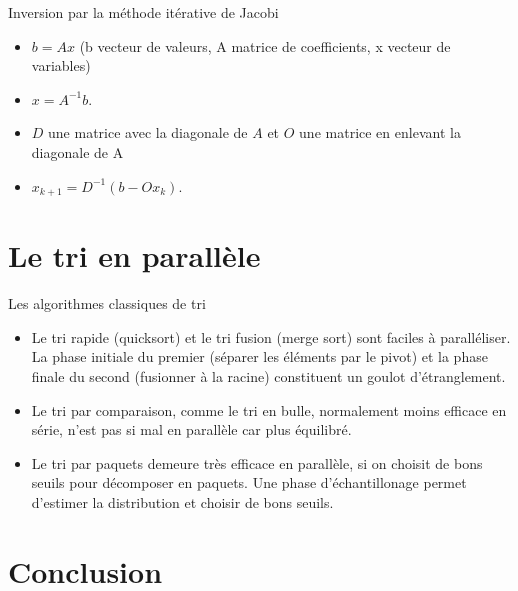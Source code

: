 \documentclass[10pt]{beamer}
\begin{document}
\begin{frame}[fragile]{Inversion par la méthode itérative de Jacobi}

  \begin{itemize}
    \item $b = Ax$ (b vecteur de valeurs, A matrice de coefficients, x vecteur de variables)
    \item $x = A^{-1}b$.
    \item $D$ une matrice avec la diagonale de $A$ et $O$ une matrice en enlevant la diagonale de A
    \item $x_{k+1} = D^{-1}(b - Ox_k)$. 
  \end{itemize}
\end{frame}

\section{Le tri en parallèle}

\begin{frame}{Les algorithmes classiques de tri}

  \begin{itemize}
    \item Le tri rapide (quicksort) et le tri fusion (merge sort) sont faciles à paralléliser. La phase initiale du premier (séparer les éléments par le pivot) et la phase finale du second (fusionner à la racine) constituent un goulot d'étranglement. 

    \item Le tri par comparaison, comme le tri en bulle, normalement moins efficace en série, n'est pas si mal en parallèle car plus équilibré.

    \item Le tri par paquets demeure très efficace en parallèle, si on choisit de bons seuils pour décomposer en paquets. Une phase d'échantillonage permet d'estimer la distribution et choisir de bons seuils.
  \end{itemize}
\end{frame}

\section{Conclusion}
\end{document}
